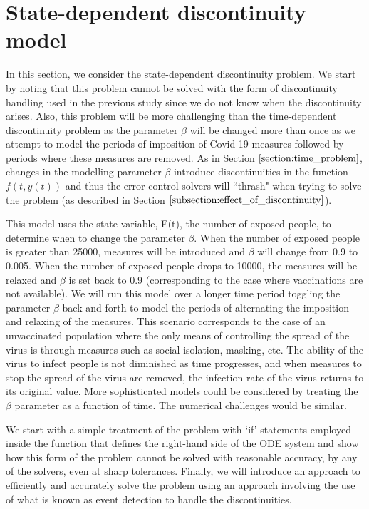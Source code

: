 
\section{State-dependent discontinuity model}
In this section, we consider the state-dependent discontinuity problem. We start by noting that this problem cannot be solved with the form of discontinuity handling used in the previous study since we do not know when the discontinuity arises. Also, this problem will be more challenging than the time-dependent discontinuity problem as the parameter $\beta$ will be changed more than once as we attempt to model the periods of imposition of Covid-19 measures followed by periods where these measures are removed. 
As in Section $\ref{section:time_problem}$, changes in the modelling parameter $\beta$ introduce discontinuities in the function $f(t, y(t))$ and thus the error control solvers will ``thrash" when trying to solve the problem (as described in Section $\ref{subsection:effect_of_discontinuity}$). 

This model uses the state variable, E(t), the number of exposed people, to determine when to change the parameter $\beta$. When the number of exposed people is greater than 25000, measures will be introduced and $\beta$ will change from 0.9 to 0.005. When the number of exposed people drops to 10000, the measures will be relaxed and $\beta$ is set back to 0.9 (corresponding to the case where vaccinations are not available). We will run this model over a longer time period toggling the parameter $\beta$ back and forth to model the periods of alternating the imposition and relaxing of the measures. This scenario corresponds to the case of an unvaccinated population where the only means of controlling the spread of the virus is through measures such as social isolation, masking, etc. The ability of the virus to infect people is not diminished as time progresses, and when measures to stop the spread of the virus are removed, the infection rate of the virus returns to its original value. More sophisticated models could be considered by treating the $\beta$ parameter as a function of time. The numerical challenges would be similar.

We start with a simple treatment of the problem with `if' statements employed inside the function that defines the right-hand side of the ODE system and show how this form of the problem cannot be solved with reasonable accuracy, by any of the solvers, even at sharp tolerances. Finally, we will introduce an approach to efficiently and accurately solve the problem using an approach involving the use of what is known as event detection to handle the discontinuities.

